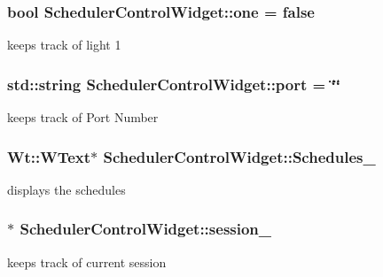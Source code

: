 \subsubsection[{\texorpdfstring{one}{one}}]{\setlength{\rightskip}{0pt plus 5cm}bool Scheduler\+Control\+Widget\+::one = false\hspace{0.3cm}{\ttfamily [private]}}\hypertarget{classSchedulerControlWidget_a52ee400ee7ef67590ab5e2d3aa095335}{}\label{classSchedulerControlWidget_a52ee400ee7ef67590ab5e2d3aa095335}
keeps track of light 1 
\subsubsection[{\texorpdfstring{port}{port}}]{\setlength{\rightskip}{0pt plus 5cm}std\+::string Scheduler\+Control\+Widget\+::port = \char`\"{}\char`\"{}\hspace{0.3cm}{\ttfamily [private]}}\hypertarget{classSchedulerControlWidget_add76e052c3bbb0bedfef92ff5121e8b0}{}\label{classSchedulerControlWidget_add76e052c3bbb0bedfef92ff5121e8b0}
keeps track of Port Number 
\subsubsection[{\texorpdfstring{Schedules\+\_\+}{Schedules_}}]{\setlength{\rightskip}{0pt plus 5cm}Wt\+::\+W\+Text$\ast$ Scheduler\+Control\+Widget\+::\+Schedules\+\_\+\hspace{0.3cm}{\ttfamily [private]}}\hypertarget{classSchedulerControlWidget_ad90a2e60df5fed38f2c824c443866f6c}{}\label{classSchedulerControlWidget_ad90a2e60df5fed38f2c824c443866f6c}
displays the schedules 
\subsubsection[{\texorpdfstring{session\+\_\+}{session_}}]{$\ast$ Scheduler\+Control\+Widget\+::session\+\_\+\hspace{0.3cm}{\ttfamily [private]}}\hypertarget{classSchedulerControlWidget_a288a93234db52da45170f791c9014459}{}\label{classSchedulerControlWidget_a288a93234db52da45170f791c9014459}
keeps track of current session 
